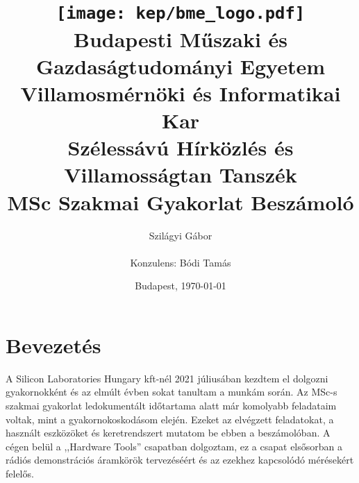 \documentclass[a4paper,12pt,titlepage]{article}
\title{
\centering
\texttt{[image: kep/bme\_logo.pdf]} \\
\vspace{0.5cm}
\large{\textbf{Budapesti Műszaki és Gazdaságtudományi Egyetem}\\
\textbf{Villamosmérnöki és Informatikai Kar}\\
\textbf{Szélessávú Hírközlés és Villamosságtan Tanszék}}\\
\vspace{5cm}
\huge{\textbf{MSc Szakmai Gyakorlat Beszámoló}} \\
\vspace{3cm}}
\author{Szilágyi Gábor \\\vspace{2cm}\\ Konzulens: Bódi Tamás}
\date{Budapest, \today}
\begin{document}
    \maketitle
    \section{Bevezetés}
    A Silicon Laboratories Hungary kft-nél 2021 júliusában kezdtem el dolgozni gyakornokként és az elmúlt évben sokat tanultam a munkám során. Az MSc-s szakmai gyakorlat ledokumentált időtartama alatt már komolyabb feladataim voltak, mint a gyakornokoskodásom elején. Ezeket az elvégzett feladatokat, a használt eszközöket és keretrendszert mutatom be ebben a beszámolóban. A cégen belül a ,,Hardware Tools'' csapatban dolgoztam, ez a csapat elsősorban a rádiós demonstrációs áramkörök tervezéséért és az ezekhez kapcsolódó mérésekért felelős.
\end{document}

